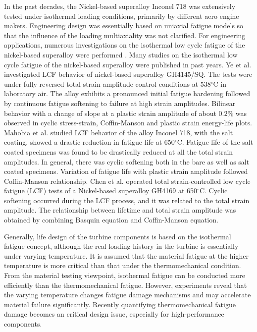 In the past decades, the Nickel-based superalloy Inconel 718 was extensively tested under isothermal loading conditions, primarily by different aero engine makers. Engineering design was essentially based on uniaxial fatigue models so that the influence of the loading multiaxiality was not clarified.
For engineering applications, numerous investigations on the isothermal low cycle fatigue of the nickel-based superalloy were performed \cite{Koch85, Morrow88, Mahobia2014, Chen2016175, William1995, kim1988elevated, nelson1992creep}.
Many studies on the isothermal low cycle fatigue of the nickel-based superalloy were published in past years.
Ye et al. \cite{ye2004low} investigated LCF behavior of nickel-based superalloy GH4145/SQ. The tests were under fully reversed total strain amplitude control conditions at 538$^{\circ}$C in laboratory air. The alloy exhibits a pronounced initial fatigue hardening followed by continuous fatigue softening to failure at high strain amplitudes. Bilinear behavior with a change of slope at a plastic strain amplitude of about $0.2\%$ was observed in cyclic stress-strain, Coffin-Manson and plastic strain energy-life plots.
Mahobia et al. \cite{mahobia2014effect} studied LCF behavior of the alloy Inconel 718, with the salt coating, showed a drastic reduction in fatigue life at 650$^{\circ}$C. Fatigue life of the salt coated specimens was found to be drastically reduced at all the total strain amplitudes. In general, there was cyclic softening both in the bare as well as salt coated specimens. Variation of fatigue life with plastic strain amplitude followed Coffin-Manson relationship.
Chen et al. \cite{Chen2016175} operated total strain-controlled low cycle fatigue (LCF) tests of a Nickel-based superalloy GH4169 at 650$^{\circ}$C. Cyclic softening occurred during the LCF process, and it was related to the total strain amplitude. The relationship between lifetime and total strain amplitude was obtained by combining Basquin equation and Coffin-Manson equation.

Generally, life design of the turbine components is based on the isothermal fatigue concept, although the real loading history in the turbine is essentially under varying temperature. It is assumed that the material fatigue at the higher temperature is more critical than that under the thermomechanical condition. From the material testing viewpoint, isothermal fatigue can be conducted more efficiently than the thermomechanical fatigue. However, experiments reveal that the varying temperature changes fatigue damage mechanisms and may accelerate material failure significantly. Recently quantifying thermomechanical fatigue damage becomes an critical design issue, especially for high-performance components.

